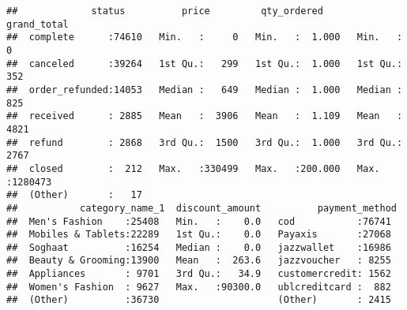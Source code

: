 \documentclass[
]{article}
\newenvironment{Shaded}{\begin{snugshade}}{\end{snugshade}}
\newcommand{\CommentTok}[1]{\textcolor[rgb]{0.56,0.35,0.01}{\textit{#1}}}
\newcommand{\DecValTok}[1]{\textcolor[rgb]{0.00,0.00,0.81}{#1}}
\newcommand{\KeywordTok}[1]{\textcolor[rgb]{0.13,0.29,0.53}{\textbf{#1}}}
\newcommand{\NormalTok}[1]{#1}
\newcommand{\OperatorTok}[1]{\textcolor[rgb]{0.81,0.36,0.00}{\textbf{#1}}}
\newcommand{\StringTok}[1]{\textcolor[rgb]{0.31,0.60,0.02}{#1}}
\begin{document}
\begin{Shaded}
\end{Shaded}

\begin{verbatim}
##             status          price         qty_ordered       grand_total     
##  complete      :74610   Min.   :     0   Min.   :  1.000   Min.   :      0  
##  canceled      :39264   1st Qu.:   299   1st Qu.:  1.000   1st Qu.:    352  
##  order_refunded:14053   Median :   649   Median :  1.000   Median :    825  
##  received      : 2885   Mean   :  3906   Mean   :  1.109   Mean   :   4821  
##  refund        : 2868   3rd Qu.:  1500   3rd Qu.:  1.000   3rd Qu.:   2767  
##  closed        :  212   Max.   :330499   Max.   :200.000   Max.   :1280473  
##  (Other)       :   17                                                       
##           category_name_1  discount_amount          payment_method 
##  Men's Fashion    :25408   Min.   :    0.0   cod           :76741  
##  Mobiles & Tablets:22289   1st Qu.:    0.0   Payaxis       :27068  
##  Soghaat          :16254   Median :    0.0   jazzwallet    :16986  
##  Beauty & Grooming:13900   Mean   :  263.6   jazzvoucher   : 8255  
##  Appliances       : 9701   3rd Qu.:   34.9   customercredit: 1562  
##  Women's Fashion  : 9627   Max.   :90300.0   ublcreditcard :  882  
##  (Other)          :36730                     (Other)       : 2415
\end{verbatim}

\begin{Shaded}
\end{Shaded}
\end{document}
